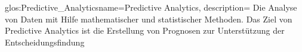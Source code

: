 


\newglossaryentry
{glos:Predictive_Analytics}{name=Predictive Analytics, description=
{Die Analyse von Daten mit Hilfe mathematischer und statistischer Methoden.
Das Ziel von Predictive Analytics ist die Erstellung von Prognosen zur
Unterstützung der Entscheidungsfindung}}
